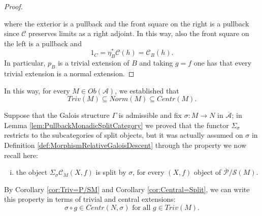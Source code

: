\begin{proposition}
\begin{proof}
        \begin{center}
        \end{center}
        where the exterior is a pullback and the front square on the right is a pullback since $\mathcal{C}$ preserves limits as a right adjoint. In this way, also the front square on the left is a pullback and
        \[ 1_C = \eta_B^*\mathcal{C}(h) = \mathcal{C}_B(h). \]
        In particular, $p_B$ is a trivial extension of $B$ and taking $g=f$ one has that every trivial extension is a normal extension.        
    \end{proof}
\end{proposition}
\begin{oss*}
    In this way, for every $M\in Ob(\mathcal{A})$, we established that
    \[ Triv(M) \subseteq Norm(M)\subseteq Centr(M). \]
\end{oss*}

Suppose that the Galois structure $\Gamma$ is admissible and fix $\sigma:M\to N$ in $\overline{\mathcal{A}}$; in Lemma \ref{lem:PullbackMonadicSplitCategory} we proved that the functor $\Sigma_\sigma$ restricts to the subcategories of split objects, but it was actually assumed on $\sigma$ in Definition \ref{def:MorphismRelativeGaloisDescent} through the property we now recall here:
\begin{enumerate}[(iii)]
    \item the object $\Sigma_\sigma\mathcal{C}_M(X,f)$ is split by $\sigma$, for every $(X,f)$ object of $\overline{\mathcal{P}}/\mathcal{S}(M)$. 
\end{enumerate}
By Corollary \ref{cor:Triv=P/SM} and Corollary \ref{cor:Central=Split}, we can write this property in terms of trivial and central extensions:
\begin{equation}
\tag{P}
\label{PropertyNormal}
    \sigma\circ g\in Centr(N,\sigma)\text{ for all }g\in Triv(M).
\end{equation}

